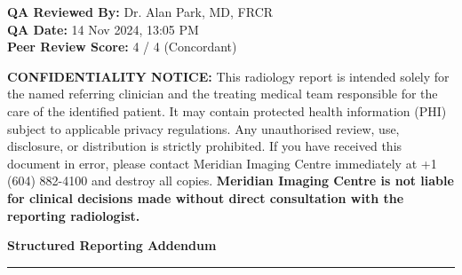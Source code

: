 \documentclass[11pt,a4paper]{article}
\newcommand{\sectionrule}{%
  \vspace{2pt}%
  {\color{RadTeal}\rule{\linewidth}{1.5pt}}%
  \vspace{4pt}%
}
\begin{document}
\begin{tcolorbox}[slatebox]
\begin{minipage}[t]{0.40\linewidth}
  \vspace{3mm}
  \noindent
  \begin{tcolorbox}[
    enhanced, colback=RadLightBlue, colframe=RadBlue, arc=3pt, boxrule=0.5pt,
    left=5pt, right=5pt, top=4pt, bottom=4pt,
  ]
    \tiny\color{RadBlue}
    \textbf{QA Reviewed By:} Dr. Alan Park, MD, FRCR\\
    \textbf{QA Date:} 14 Nov 2024, 13:05 PM\\
    \textbf{Peer Review Score:} 4 / 4 (Concordant)
  \end{tcolorbox}
\end{minipage}
\end{tcolorbox}

\vspace{8pt}


\begin{tcolorbox}[
  enhanced,
  colback=RadBg,
  colframe=RadRule,
  arc=3pt, boxrule=0.5pt,
  left=8pt, right=8pt, top=4pt, bottom=4pt,
]
\tiny\color{RadSlate}
\textbf{CONFIDENTIALITY NOTICE:} This radiology report is intended solely for the named referring clinician and the treating medical team responsible for the care of the identified patient. It may contain protected health information (PHI) subject to applicable privacy regulations. Any unauthorised review, use, disclosure, or distribution is strictly prohibited. If you have received this document in error, please contact Meridian Imaging Centre immediately at +1 (604) 882-4100 and destroy all copies. \textbf{Meridian Imaging Centre is not liable for clinical decisions made without direct consultation with the reporting radiologist.}
\end{tcolorbox}

\newpage


\noindent\textbf{\color{RadBlue}\fontsize{13}{16}\selectfont Structured Reporting Addendum}
\vspace{3pt}

\sectionrule{}

\vspace{4pt}
\end{document}
